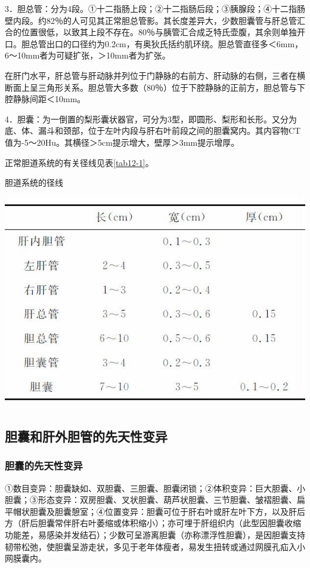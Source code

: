 3．胆总管：分为4段。①十二指肠上段；②十二指肠后段；③胰腺段；④十二指肠壁内段。约82％的人可见其正常胆总管影。其长度差异大，少数胆囊管与肝总管汇合的位置很低，以致其上段不存在。80％与胰管汇合成乏特氏壶腹，其余则单独开口。胆总管出口的口径约为0.2cm，有奥狄氏括约肌环绕。胆总管直径多＜6mm，6～10mm者为可疑扩张，＞10mm者为扩张。

在肝门水平，肝总管与肝动脉并列位于门静脉的右前方、肝动脉的右侧，三者在横断面上呈三角形关系。胆总管大多数（80％）位于下腔静脉的正前方，胆总管与下腔静脉间距＜10mm。

4．胆囊：为一倒置的梨形囊状器官，可分为3型，即圆形、梨形和长形。又分为底、体、漏斗和颈部，位于左叶内段与肝右叶前段之间的胆囊窝内。其内容物CT值为-5～20Hu。其横径＞5cm提示增大，壁厚＞3mm提示增厚。

正常胆道系统的有关径线见表\ref{tab12-1}。

\begin{table}[htbp]
\centering
\caption{胆道系统的径线}
\label{tab12-1}
\includegraphics[width=\textwidth,height=\textheight,keepaspectratio]{./images/Image00291.jpg}
\end{table}

\subsection{胆囊和肝外胆管的先天性变异}

\subsubsection{胆囊的先天性变异}

①数目变异：胆囊缺如、双胆囊、三胆囊、胆囊闭锁；②体积变异：巨大胆囊、小胆囊；③形态变异：双房胆囊、叉状胆囊、葫芦状胆囊、三节胆囊、皱褶胆囊、扁平帽状胆囊及胆囊憩室；④位置变异：胆囊可位于肝右叶或肝左叶下方，以及肝后方（肝后胆囊常伴肝右叶萎缩或体积缩小）；亦可埋于肝组织内（此型因胆囊收缩功能差，易感染并发结石）；少数可呈游离胆囊（亦称漂浮性胆囊），是因胆囊支持韧带松弛，使胆囊呈游走状，多见于老年体瘦者，易发生扭转或通过网膜孔疝入小网膜囊内。

